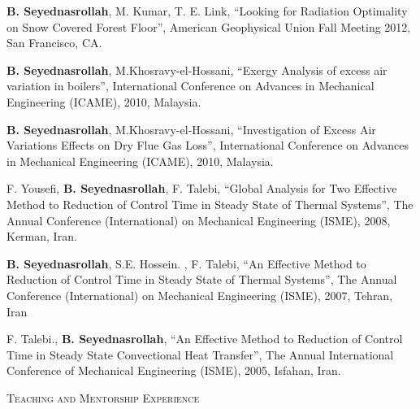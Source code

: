 \documentclass[10pt]{article}
\newenvironment{changemargin}[2]{%
  \begin{list}{}{%
    \setlength{\topsep}{0pt}%
    \setlength{\leftmargin}{#1}%
    \setlength{\rightmargin}{#2}%
    \setlength{\listparindent}{\parindent}%
    \setlength{\itemindent}{\parindent}%
    \setlength{\parsep}{\parskip}%
  }%
  \item[]}{\end{list}
}
\newcommand{\lineover}{
	\begin{changemargin}{-0.05in}{-0.05in}
		\vspace*{-8pt}
		\hrulefill \\
		\vspace*{-2pt}
	\end{changemargin}
}
\newcommand{\header}[1]{
	\begin{changemargin}{-0.5in}{-0.5in}
		\scshape{#1}\\
  	\lineover
	\end{changemargin}
}
\newenvironment{body} {
	\vspace*{-2pt}
	\begin{changemargin}{-0.5in}{-0.5in}
  }
	{\end{changemargin}
}
\begin{document}
\begin{body}
   \textbf{B. Seyednasrollah}, M. Kumar, T. E. Link, ``Looking for Radiation Optimality on Snow Covered Forest Floor'', American Geophysical Union Fall Meeting 2012, San Francisco, CA.\\
\medskip

   \textbf{B. Seyednasrollah}, M.Khosravy-el-Hossani, ``Exergy Analysis of excess air variation in boilers'', International Conference on Advances in Mechanical Engineering (ICAME), 2010, Malaysia.\\
\medskip

   \textbf{B. Seyednasrollah}, M.Khosravy-el-Hossani, ``Investigation of Excess Air Variations Effects on Dry Flue Gas Loss'', International Conference on Advances in Mechanical Engineering (ICAME), 2010, Malaysia.\\
\medskip


   F. Yousefi, \textbf{B. Seyednasrollah}, F. Talebi, ``Global Analysis for Two Effective Method to Reduction of Control Time in Steady State of Thermal Systems'', The Annual Conference (International) on Mechanical Engineering (ISME), 2008, Kerman, Iran. \\
\medskip

   \textbf{B. Seyednasrollah}, S.E. Hossein. , F. Talebi, ``An Effective Method to Reduction of Control Time in Steady State of Thermal Systems'', The Annual Conference (International) on Mechanical Engineering (ISME), 2007, Tehran, Iran\\
\medskip

   F. Talebi., \textbf{B. Seyednasrollah}, ``An Effective Method to Reduction of Control Time in Steady State Convectional Heat Transfer'', The Annual International Conference of Mechanical Engineering (ISME), 2005, Isfahan, Iran.\\
\medskip


\end{body}
\medskip

\header{Teaching and Mentorship Experience}
\end{document}
